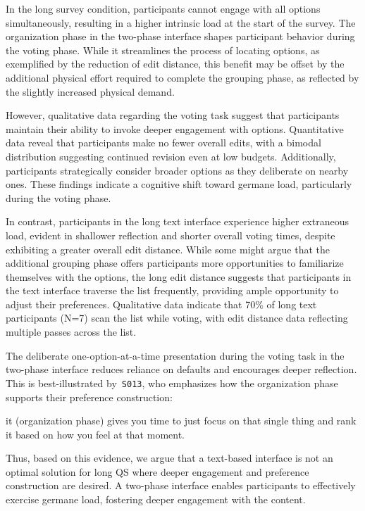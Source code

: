 In the long survey condition, participants cannot engage with all options simultaneously, resulting in a higher intrinsic load at the start of the survey. The organization phase in the two-phase interface shapes participant behavior during the voting phase. While it streamlines the process of locating options, as exemplified by the reduction of edit distance, this benefit may be offset by the additional physical effort required to complete the grouping phase, as reflected by the slightly increased physical demand.  

However, qualitative data regarding the voting task suggest that participants maintain their ability to invoke deeper engagement with options. Quantitative data reveal that participants make no fewer overall edits, with a bimodal distribution suggesting continued revision even at low budgets. Additionally, participants strategically consider broader options as they deliberate on nearby ones. These findings indicate a cognitive shift toward germane load, particularly during the voting phase.

In contrast, participants in the long text interface experience higher extraneous load, evident in shallower reflection and shorter overall voting times, despite exhibiting a greater overall edit distance. While some might argue that the additional grouping phase offers participants more opportunities to familiarize themselves with the options, the long edit distance suggests that participants in the text interface traverse the list frequently, providing ample opportunity to adjust their preferences. Qualitative data indicate that 70\% of long text participants (N=7) scan the list while voting, with edit distance data reflecting multiple passes across the list.

The deliberate one-option-at-a-time presentation during the voting task in the two-phase interface reduces reliance on defaults and encourages deeper reflection. This is best-illustrated by~\texttt{S013}, who emphasizes how the organization phase supports their preference construction:  
\begin{displayquote}  
\bracketellipsis it (organization phase) gives you time to just focus on that single thing and rank it based on how you feel at that moment. \hfill{}  
\end{displayquote}  

Thus, based on this evidence, we argue that a text-based interface is not an optimal solution for long QS where deeper engagement and preference construction are desired. A two-phase interface enables participants to effectively exercise germane load, fostering deeper engagement with the content.


